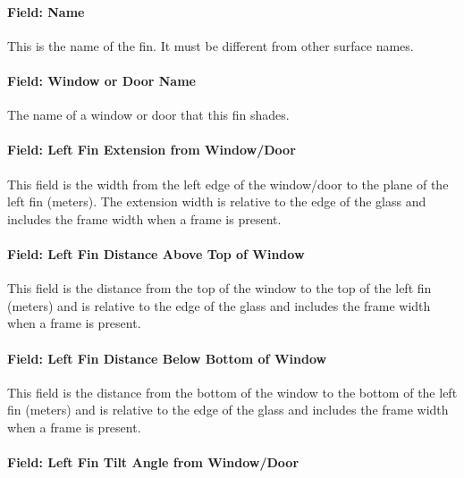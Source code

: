 \paragraph{Field: Name}\label{field-name-27-003}

This is the name of the fin. It must be different from other surface names.

\paragraph{Field: Window or Door Name}\label{field-window-or-door-name-3}

The name of a window or door that this fin shades.

\paragraph{Field: Left Fin Extension from Window/Door}\label{field-left-fin-extension-from-windowdoor-1}

This field is the width from the left edge of the window/door to the plane of the left fin (meters). The extension width is relative to the edge of the glass and includes the frame width when a frame is present.

\paragraph{Field: Left Fin Distance Above Top of Window}\label{field-left-fin-distance-above-top-of-window-1}

This field is the distance from the top of the window to the top of the left fin (meters) and is relative to the edge of the glass and includes the frame width when a frame is present.

\paragraph{Field: Left Fin Distance Below Bottom of Window}\label{field-left-fin-distance-below-bottom-of-window-1}

This field is the distance from the bottom of the window to the bottom of the left fin (meters) and is relative to the edge of the glass and includes the frame width when a frame is present.

\paragraph{Field: Left Fin Tilt Angle from Window/Door}\label{field-left-fin-tilt-angle-from-windowdoor-1}

